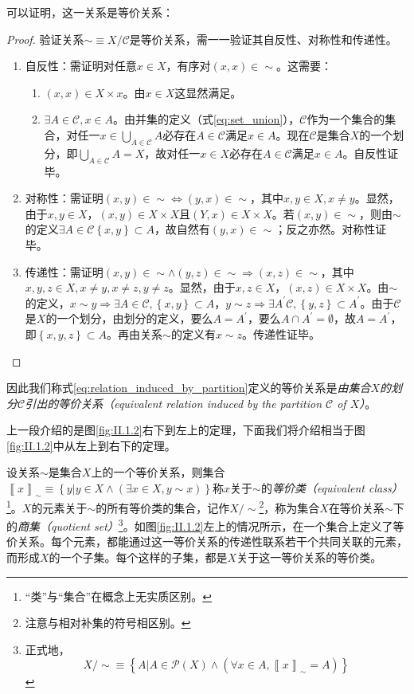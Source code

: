 \documentclass[../main.tex]{subfiles}
\begin{document}
可以证明，这一关系是等价关系：
\begin{proof}
    验证关系$\sim\equiv X/\mathcal{C}$是等价关系，需一一验证其自反性、对称性和传递性。
    \begin{enumerate}
        \item 自反性：需证明对任意$x\in X$，有序对$\left(x,x\right)\in\sim$。这需要：
              \begin{enumerate}
                  \item $\left(x,x\right)\in X\times x$。由$x\in X$这显然满足。
                  \item $\exists A\in\mathcal{C},x\in A$。由并集的定义（式\eqref{eq:set_union}），$\mathcal{C}$作为一个集合的集合，对任一$x\in\bigcup_{A\in\mathcal{C}}A$必存在$A\in\mathcal{C}$满足$x\in A$。现在$\mathcal{C}$是集合$X$的一个划分，即$\bigcup_{A\in\mathcal{C}}A=X$，故对任一$x\in X$必存在$A\in\mathcal{C}$满足$x\in A$。自反性证毕。
              \end{enumerate}
        \item 对称性：需证明$\left(x,y\right)\in\sim\Leftrightarrow\left(y,x\right)\in\sim$，其中$x,y\in X,x\neq y$。显然，由于$x,y\in X$，$\left(x,y\right)\in X\times X$且$\left(Y,x\right)\in X\times X$。若$\left(x,y\right)\in\sim$，则由$\sim$的定义$\exists A\in\mathcal{C}\left\{x,y\right\}\subset A$，故自然有$\left(y,x\right)\in\sim$；反之亦然。对称性证毕。
        \item 传递性：需证明$\left(x,y\right)\in\sim\wedge\left(y,z\right)\in\sim\Rightarrow\left(x,z\right)\in\sim$，其中$x,y,z\in X,x\neq y,x\neq z,y\neq z$。显然，由于$x,z\in X$，$\left(x,z\right)\in X\times X$。由$\sim$的定义，$x\sim y\Rightarrow\exists A\in\mathcal{C},\left\{x,y\right\}\subset A$，$y\sim z\Rightarrow\exists A^\prime\mathcal{C},\left\{y,z\right\}\subset A^\prime$。由于$\mathcal{C}$是$X$的一个划分，由划分的定义，要么$A=A^\prime$，要么$A\cap A^\prime=\emptyset$，故$A=A^\prime$，即$\left\{x,y,z\right\}\subset A$。再由关系$\sim$的定义有$x\sim z$。传递性证毕。
    \end{enumerate}
\end{proof}
因此我们称式\eqref{eq:relation_induced_by_partition}定义的等价关系是\emph{由集合$X$的划分$\mathcal{C}$引出的等价关系（equivalent relation induced by the partition $\mathcal{C}$ of $X$）}。

上一段介绍的是图\ref{fig:II.1.2}右下到左上的定理，下面我们将介绍相当于图\ref{fig:II.1.2}中从左上到右下的定理。

设关系$\sim$是集合$X$上的一个等价关系，则集合$\left\llbracket x\right\rrbracket_\sim\equiv\left\{y|y\in X\wedge\left(\exists x\in X,y\sim x\right)\right\}$称$x$关于$\sim$的\emph{等价类（equivalent class）}\footnote{“类”与“集合”在概念上无实质区别。}。$X$的元素关于$\sim$的所有等价类的集合，记作$X/\sim$\footnote{注意与相对补集的符号相区别。}，称为集合$X$在等价关系$\sim$下的\emph{商集（quotient set）}\footnote{正式地，
    \[
        X/\sim\equiv\left\{A|A\in\mathcal{P}\left(X\right)\wedge\left(\forall x\in A,\left\llbracket x\right\rrbracket_\sim = A\right)\right\}
    \]
}。如图\ref{fig:II.1.2}左上的情况所示，在一个集合上定义了等价关系。每个元素，都能通过这一等价关系的传递性联系若干个共同关联的元素，而形成$X$的一个子集。每个这样的子集，都是$X$关于这一等价关系的等价类。
\end{document}
